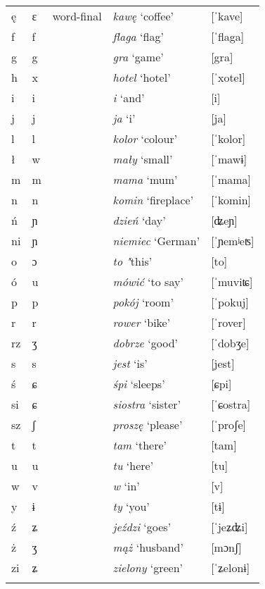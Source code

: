 {\begin{tabular}{lllll}
        ę & ɛ & word-final & \textit{kawę} `coffee' & [ˈkave]\\
        f & f &  & \textit{flaga} `flag' & [ˈflaga]\\
        g & g &  & \textit{gra} `game' & [gra]\\
        h & x &  & \textit{hotel} `hotel' & [ˈxotel]\\
        i & i &  & \textit{i} `and' & [i]\\
        j & j &  & \textit{ja} `i' & [ja]\\
        l & l &  & \textit{kolor} `colour' & [ˈkolor]\\
        ł & w &  & \textit{mały} `small' & [ˈmawɨ]\\
        m & m &  & \textit{mama} `mum' & [ˈmama]\\
        n & n &  & \textit{komin} `fireplace' & [ˈkomin]\\
        ń & ɲ &  & \textit{dzień} `day' & [ʥeɲ]\\
        ni & ɲ &  & \textit{niemiec} `German' & [ˈɲemʲeʦ]\\
        o & ɔ &  & \textit{to} \textit{"}this' & [to]\\
        ó & u &  & \textit{mówić} `to say' & [ˈmuviʨ]\\
        p & p &  & \textit{pokój} `room' & [ˈpokuj]\\
        r & r &  & \textit{rower} `bike' & [ˈrover]\\
        rz & ʒ &  & \textit{dobrze} `good' & [ˈdobʒe]\\
        s & s &  & \textit{jest} `is' & [jest]\\
        ś & ɕ &  & \textit{śpi} `sleeps' & [ɕpi]\\
        si & ɕ &  & \textit{siostra} `sister' & [ˈɕostra]\\
        sz & ʃ &  & \textit{proszę} `please' & [ˈproʃe]\\
        t & t &  & \textit{tam} `there' & [tam]\\
        u & u &  & \textit{tu} `here' & [tu]\\
        w & v &  & \textit{w} `in' & [v]\\
        y & ɨ &  & \textit{ty} `you' & [tɨ]\\
        ź & ʑ &  & \textit{jeździ} `goes' & [ˈjeʑʥi]\\
        ż & ʒ &  & \textit{mąż} `husband' & [mɔnʃ]\\
        zi & ʑ &  & \textit{zielony} `green' & [ˈʑelonɨ]\\
        \lspbottomrule
    \end{tabular}
}
